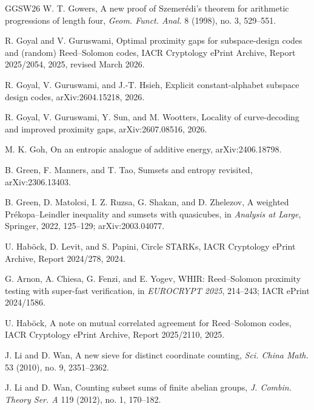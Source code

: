 \documentclass[12pt,a4paper]{amsart}
\numberwithin{equation}{section}
\theoremstyle{remark}
\begin{document}
\begin{thebibliography}{GGSW26}
W. T. Gowers,
\newblock A new proof of Szemerédi's theorem for arithmetic progressions of length four,
\newblock \emph{Geom. Funct. Anal.} 8 (1998), no. 3, 529--551.

R. Goyal and V. Guruswami,
\newblock Optimal proximity gaps for subspace-design codes and (random)
Reed--Solomon codes,
\newblock IACR Cryptology ePrint Archive, Report 2025/2054, 2025,
revised March 2026.

R. Goyal, V. Guruswami, and J.-T. Hsieh,
\newblock Explicit constant-alphabet subspace design codes,
\newblock arXiv:2604.15218, 2026.

R. Goyal, V. Guruswami, Y. Sun, and M. Wootters,
\newblock Locality of curve-decoding and improved proximity gaps,
\newblock arXiv:2607.08516, 2026.

M. K. Goh,
\newblock On an entropic analogue of additive energy,
\newblock arXiv:2406.18798.

B. Green, F. Manners, and T. Tao,
\newblock Sumsets and entropy revisited,
\newblock arXiv:2306.13403.

B. Green, D. Matolcsi, I. Z. Ruzsa, G. Shakan, and D. Zhelezov,
\newblock A weighted Prékopa--Leindler inequality and sumsets with quasicubes,
\newblock in \emph{Analysis at Large}, Springer, 2022, 125--129; arXiv:2003.04077.

U. Hab\"ock, D. Levit, and S. Papini,
\newblock Circle STARKs,
\newblock IACR Cryptology ePrint Archive, Report 2024/278, 2024.

G. Arnon, A. Chiesa, G. Fenzi, and E. Yogev,
\newblock WHIR: Reed--Solomon proximity testing with super-fast verification,
\newblock in \emph{EUROCRYPT 2025}, 214--243;
IACR ePrint 2024/1586.

U. Hab\"ock,
\newblock A note on mutual correlated agreement for Reed--Solomon codes,
\newblock IACR Cryptology ePrint Archive, Report 2025/2110, 2025.

J. Li and D. Wan,
\newblock A new sieve for distinct coordinate counting,
\newblock \emph{Sci. China Math.} 53 (2010), no. 9, 2351--2362.

J. Li and D. Wan,
\newblock Counting subset sums of finite abelian groups,
\newblock \emph{J. Combin. Theory Ser. A} 119 (2012), no. 1, 170--182.


\end{thebibliography}
\end{document}
